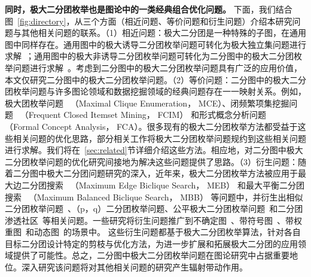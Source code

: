 \textbf{同时，极大二分团枚举也是图论中的一类经典组合优化问题。}
下面，我们结合图~\ref{fig:directory}，从三个方面（相近问题、等价问题和衍生问题）介绍本研究问题与其他相关问题的联系。（1）相近问题：极大二分团是一种特殊的子图，在通用图中同样存在。通用图中的极大诱导二分团枚举问题可转化为极大独立集问题进行求解~\cite{MBE-induced21}；通用图中的极大非诱导二分团枚举问题可转化为二分图中的极大二分团枚举问题进行求解~\cite{Proof09}。考虑到二分图中的极大二分团枚举问题具有广泛的应用价值，本文仅研究二分图中的极大二分团枚举问题。（2）等价问题：二分图中的极大二分团枚举问题与许多图论领域和数据挖掘领域的经典问题存在一一映射关系。例如，极大团枚举问题~\cite{MCEchinese17,MCE20,MCEchinese20,MCE-GPU21,MCEchinese21,MCE22,MCEreview22} （Maximal Clique Enumeration， MCE）、闭频繁项集挖掘问题~\cite{FCIM98,FCIM22} （Frequent Closed Itemset Mining， FCIM） 和形式概念分析问题~\cite{FCA21,FCA22} （Formal Concept Analysis， FCA）。很多现有的极大二分团枚举方法都受益于这些相关问题的优化思路，部分相关工作将极大二分团枚举问题规约到这些相关问题进行求解。我们将在~\ref{sec:related}节详细介绍这些方法。相应地，对二分图中极大二分团枚举问题的优化研究间接地为解决这些问题提供了思路。（3）衍生问题：随着二分图中极大二分团问题研究的深入，近年来，极大二分团枚举方法被应用于最大边二分团搜索~\cite{MEB20,MEB22} （Maximum Edge Biclique Search， MEB） 和最大平衡二分团搜索~\cite{MBB21} （Maximum Balanced Biclique Search， MBB） 等问题中，并衍生出相似二分团枚举问题~\cite{SimilarMBE22}、（p，q）二分团枚举问题\cite{Pqbiclique21,Pqbiclique23,Pq23,pqchinese22}、公平极大二分团枚举问题~\cite{FairMBE23}和二分团渗透社区~\cite{BicliqueCommunity23}等相关问题。一些研究将衍生问题推广到不确定图~\cite{MBEU23}、带符号图~\cite{Sun22,Sun23}、带权重图~\cite{WeightMEB22,WeightMBB22}和动态图~\cite{Ma22}的场景中。
这些衍生问题都基于极大二分团枚举算法，针对各自目标二分团设计特定的剪枝与优化方法，为进一步扩展和拓展极大二分团的应用领域提供了可能性。总之，二分图中极大二分团枚举问题在图论研究中占据重要地位。深入研究该问题将对其他相关问题的研究产生辐射带动作用。


